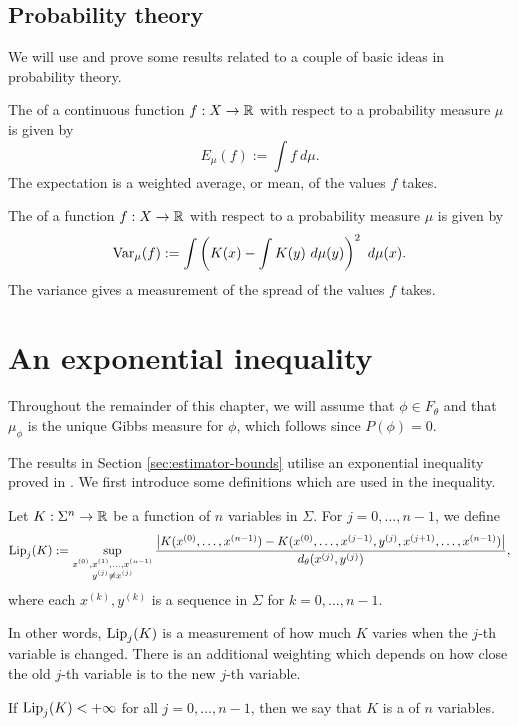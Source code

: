 \subsection{Probability theory}
We will use and prove some results related to a couple of basic ideas in probability theory.
\begin{definition}
	The  of a continuous function $f : X \to \mathbb{R}$ with respect to a probability measure $\mu$ is given by
	\[
		E_\mu(f) := \int{f\ d\mu}.
	\]
	The expectation is a weighted average, or mean, of the values $f$ takes.~\cite[p127]{gray:probability}
\end{definition}

\begin{definition}
	The  of a function $f : X \to \mathbb{R}$ with respect to a probability measure $\mu$ is given by
	\[
		\operatorname{Var}_{\mu}(f) := \int{\left(K(x) - \int{K(y)\ d\mu(y)}\right)^2\ d\mu(x)}.
	\]
	The variance gives a measurement of the spread of the values $f$ takes.
\end{definition}

\section{An exponential inequality}
Throughout the remainder of this chapter, we will assume that $\phi \in F_\theta$ and that $\mu_\phi$ is the unique Gibbs measure for $\phi$, which follows since $P(\phi) = 0$.

The results in Section \ref{sec:estimator-bounds} utilise an exponential inequality proved in \cite{collet-martinez-schmitt:exp-ineq}. We first introduce some definitions which are used in the inequality.

\begin{definition}
	Let $K : \Sigma^n \to \mathbb{R}$ be a function of $n$ variables in $\Sigma$. For $j = 0, \dots, n - 1$, we define
	\[
		\operatorname{Lip}_j(K) := \sup_{\substack{x^{(0)}, x^{(1)}, \dots, x^{(n - 1)} \\ y^{(j)} \neq x^{(j)}}}{\frac{\left|K(x^{(0)}, \dots, x^{(n - 1)}) - K(x^{(0)}, \dots, x^{(j - 1)}, y^{(j)}, x^{(j + 1)}, \dots, x^{(n - 1)})\right|}{d_\theta(x^{(j)}, y^{(j)})}},
	\]
	where each $x^{(k)}, y^{(k)}$ is a sequence in $\Sigma$ for $k = 0, \dots, n - 1$.
	
	In other words, $\operatorname{Lip}_j(K)$ is a measurement of how much $K$ varies when the $j$-th variable is changed. There is an additional weighting which depends on how close the old $j$-th variable is to the new $j$-th variable.
	
	If $\operatorname{Lip}_j(K) < +\infty$ for all $j = 0, \dots, n - 1$, then we say that $K$ is a  of $n$ variables.
\end{definition}

